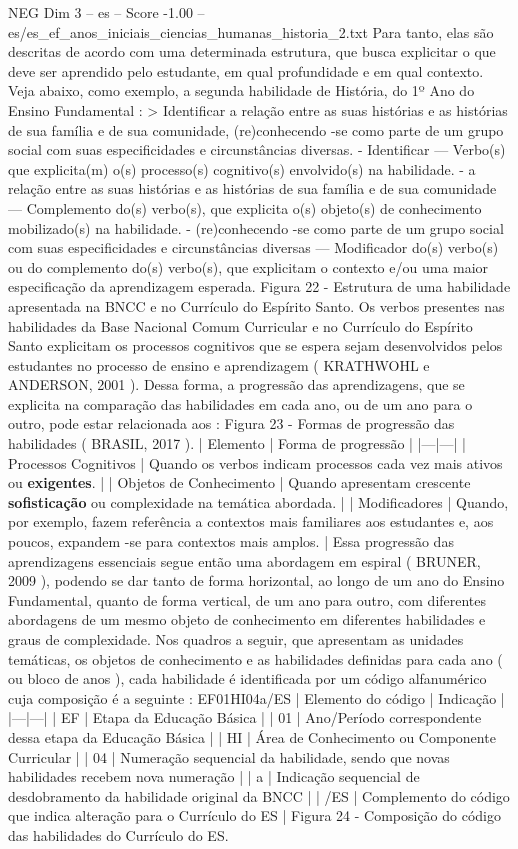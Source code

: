 \begin{textsample}{NEG Dim 3 – es – Score -1.00 – es/es\_ef\_anos\_iniciais\_ciencias\_humanas\_historia\_2.txt}
Para tanto, elas são descritas de acordo com uma determinada estrutura, que busca explicitar o que deve ser aprendido pelo estudante, em qual profundidade e em qual contexto.
Veja abaixo, como exemplo, a segunda habilidade de História, do 1º Ano do Ensino Fundamental : > Identificar a relação entre as suas histórias e as histórias de sua família e de sua comunidade, (re)conhecendo -se como parte de um grupo social com suas especificidades e circunstâncias diversas. - Identificar — Verbo(s) que explicita(m) o(s) processo(s) cognitivo(s) envolvido(s) na habilidade. - a relação entre as suas histórias e as histórias de sua família e de sua comunidade — Complemento do(s) verbo(s), que explicita o(s) objeto(s) de conhecimento mobilizado(s) na habilidade. - (re)conhecendo -se como parte de um grupo social com suas especificidades e circunstâncias diversas — Modificador do(s) verbo(s) ou do complemento do(s) verbo(s), que explicitam o contexto e/ou uma maior especificação da aprendizagem esperada.
Figura 22 - Estrutura de uma habilidade apresentada na BNCC e no Currículo do Espírito Santo.
Os verbos presentes nas habilidades da Base Nacional Comum Curricular e no Currículo do Espírito Santo explicitam os processos cognitivos que se espera sejam desenvolvidos pelos estudantes no processo de ensino e aprendizagem ( KRATHWOHL e ANDERSON, 2001 ).
Dessa forma, a progressão das aprendizagens, que se explicita na comparação das habilidades em cada ano, ou de um ano para o outro, pode estar relacionada aos : Figura 23 - Formas de progressão das habilidades ( BRASIL, 2017 ). | Elemento | Forma de progressão | |---|---| | Processos Cognitivos | Quando os verbos indicam processos cada vez mais ativos ou \textbf{exigentes}. | | Objetos de Conhecimento | Quando apresentam crescente \textbf{sofisticação} ou complexidade na temática abordada. | | Modificadores | Quando, por exemplo, fazem referência a contextos mais familiares aos estudantes e, aos poucos, expandem -se para contextos mais amplos. | Essa progressão das aprendizagens essenciais segue então uma abordagem em espiral ( BRUNER, 2009 ), podendo se dar tanto de forma horizontal, ao longo de um ano do Ensino Fundamental, quanto de forma vertical, de um ano para outro, com diferentes abordagens de um mesmo objeto de conhecimento em diferentes habilidades e graus de complexidade.
Nos quadros a seguir, que apresentam as unidades temáticas, os objetos de conhecimento e as habilidades definidas para cada ano ( ou bloco de anos ), cada habilidade é identificada por um código alfanumérico cuja composição é a seguinte : EF01HI04a/ES | Elemento do código | Indicação | |---|---| | EF | Etapa da Educação Básica | | 01 | Ano/Período correspondente dessa etapa da Educação Básica | | HI | Área de Conhecimento ou Componente Curricular | | 04 | Numeração sequencial da habilidade, sendo que novas habilidades recebem nova numeração | | a | Indicação sequencial de desdobramento da habilidade original da BNCC | | /ES | Complemento do código que indica alteração para o Currículo do ES | Figura 24 - Composição do código das habilidades do Currículo do ES.

\end{textsample}
